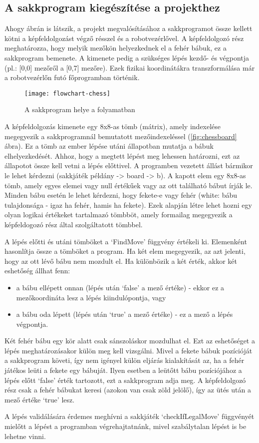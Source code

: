 \documentclass[../documentation.tex]{subfiles}
\begin{document}
\subsection{A sakkprogram kiegészítése a projekthez}
Ahogy  ábrán is látszik, a projekt megvalósításához a sakkprogramot össze kellett kötni a képfeldolgozást végző résszel és a robotvezérlővel. A képfeldolgozó rész meghatározza, hogy melyik mezőkön helyezkednek el a fehér bábuk, ez a sakkprogram bemenete. A kimenete pedig a szükséges lépés kezdő- és végpontja (pl.: [0,0] mezőről a [0,7] mezőre). Ezek fizikai koordinátákra transzformálása már a robotvezérlőn futó főprogramban történik. 

\begin{figure}[h]
\centering
\texttt{[image: flowchart-chess]}
\caption{A sakkprogram helye a folyamatban}
\label{fig:flowchart-chess}
\end{figure}

A képfeldolgozás kimenete egy 8x8-as tömb (mátrix), amely indexelése megegyezik a sakkprogramnál bemutatott mezőindexeléssel (\ref{fig:chessboard} ábra). Ez a tömb az ember lépése utáni állapotban mutatja a bábuk elhelyezkedését. Ahhoz, hogy a megtett lépést meg lehessen határozni, ezt az állapotot össze kell vetni a lépés előttivel. A programben vezetett állást bármikor le lehet kérdezni (sakkjáték példány -> board -> b). A kapott elem egy 8x8-as tömb, amely egyes elemei vagy null értékűek vagy az ott található bábut írják le. Minden bábu esetén le lehet kérdezni, hogy fekete-e vagy fehér (white: bábu  tulajdonsága - igaz ha fehér, hamis ha fekete). Ezek alapján létre lehet hozni egy olyan logikai értékeket tartalmazó tömbböt, amely formailag megegyezik a képfeldogozó rész által szolgáltatott tömbbel.

A lépés előtti és utáni tömböket a `FindMove' függvény értékeli ki. Elemenként hasonlítja össze a tömböket a program. Ha két elem megegyezik, az azt jelenti, hogy az ott lévő bábu nem mozdult el. Ha különbözik a két érték, akkor két eshetőség állhat fenn:

\begin{itemize}
	\item a bábu ellépett onnan (lépés után `false' a mező értéke) - ekkor ez a mezőkoordináta lesz a lépés kiindulópontja, vagy
	\item a bábu oda lépett (lépés után `true' a mező értéke) - ez a mező a lépés végpontja.
\end{itemize}

Két fehér bábu egy kör alatt csak sánszoláskor mozdulhat el. Ezt az eshetőséget a lépés meghatározásakor külön meg kell vizsgálni. Mivel a fekete bábuk pozícióját a sakkprogram követi, így nem igényel külön eljárás kialakítását az, ha a fehér játékos leüti a fekete egy bábuját. Ilyen esetben a leütőtt bábu pozíciójához a lépés előtt `false' érték tartozott, ezt a sakkprogram adja meg. A képfeldolgozó rész csak a fehér bábukat keresi (azokon van csak zöld jelölő), így az ütés után a mező értéke `true' lesz.

A lépés validálására érdemes meghívni a sakkjáték `checkIfLegalMove' függvényét mielőtt a lépést a programban végrehajtatnánk, mivel szabálytalan lépést is be lehetne vinni.
\end{document}

